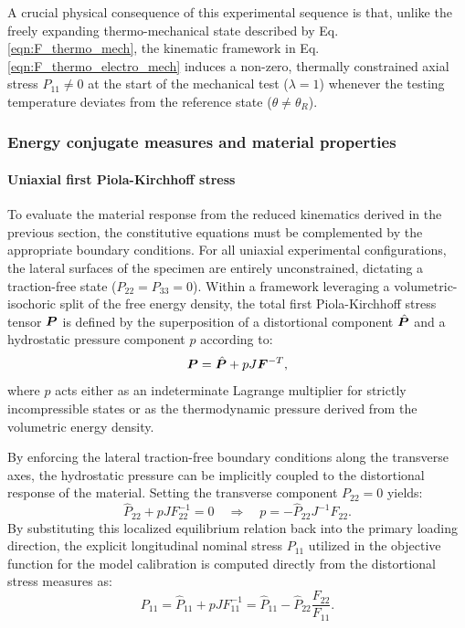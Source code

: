 A crucial physical consequence of this experimental sequence is that, unlike the freely expanding thermo-mechanical state described by Eq. \eqref{eqn:F_thermo_mech}, the kinematic framework in Eq. \eqref{eqn:F_thermo_electro_mech} induces a non-zero, thermally constrained axial stress $P_{11} \neq 0$ at the start of the mechanical test ($\lambda = 1$) whenever the testing temperature deviates from the reference state ($\theta \neq \theta_R$).



\subsubsection{Energy conjugate measures and material properties}


\paragraph{Uniaxial first Piola-Kirchhoff stress}
To evaluate the material response from the reduced kinematics derived in the previous section, the constitutive equations must be complemented by the appropriate boundary conditions. For all uniaxial experimental configurations, the lateral surfaces of the specimen are entirely unconstrained, dictating a traction-free state ($P_{22} = P_{33} = 0$). Within a framework leveraging a volumetric-isochoric split of the free energy density, the total first Piola-Kirchhoff stress tensor $\P$ is defined by the superposition of a distortional component $\hat\P$ and a hydrostatic pressure component $p$ according to:
%
\begin{equation}
    \vect{P} = \hat\P + p J \F^{-T},
\end{equation}
%
where $p$ acts either as an indeterminate Lagrange multiplier for strictly incompressible states or as the thermodynamic pressure derived from the volumetric energy density. 

By enforcing the lateral traction-free boundary conditions along the transverse axes, the hydrostatic pressure can be implicitly coupled to the distortional response of the material. Setting the transverse component $P_{22} = 0$ yields:
%
\begin{equation}
    \hat{P}_{22} + p J F_{22}^{-1} = 0 \quad\Longrightarrow\quad p = -\hat{P}_{22} J^{-1} F_{22}.
\end{equation}
%
By substituting this localized equilibrium relation back into the primary loading direction, the explicit longitudinal nominal stress $P_{11}$ utilized in the objective function for the model calibration is computed directly from the distortional stress measures as:
%
\begin{equation}
    \label{eqn:experim_P11}
    P_{11} = \hat{P}_{11} + p J F_{11}^{-1} = \hat{P}_{11} - \hat{P}_{22} \frac{F_{22}}{F_{11}}.
\end{equation}


